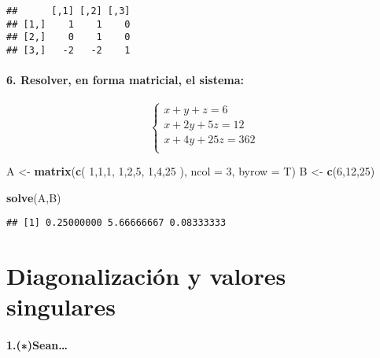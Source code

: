 \documentclass[]{article}
\newenvironment{Shaded}{\begin{snugshade}}{\end{snugshade}}
\newcommand{\DataTypeTok}[1]{\textcolor[rgb]{0.13,0.29,0.53}{#1}}
\newcommand{\DecValTok}[1]{\textcolor[rgb]{0.00,0.00,0.81}{#1}}
\newcommand{\KeywordTok}[1]{\textcolor[rgb]{0.13,0.29,0.53}{\textbf{#1}}}
\newcommand{\NormalTok}[1]{#1}
\newcommand{\StringTok}[1]{\textcolor[rgb]{0.31,0.60,0.02}{#1}}
\let\oldparagraph\paragraph
\renewcommand{\paragraph}[1]{\oldparagraph{#1}\mbox{}}
\begin{document}
\begin{verbatim}
##      [,1] [,2] [,3]
## [1,]    1    1    0
## [2,]    0    1    0
## [3,]   -2   -2    1
\end{verbatim}

\hypertarget{resolver-en-forma-matricial-el-sistema}{%
\paragraph{6. Resolver, en forma matricial, el
sistema:}\label{resolver-en-forma-matricial-el-sistema}}

\[ 
\begin{cases}
    x + y +z = 6 \\ 
   x + 2y+ 5z= 12 \\
   x+ 4y+ 25z= 362 \\
  \end{cases}
\]

\begin{Shaded}
\begin{Highlighting}[]
\NormalTok{A <-}\StringTok{ }\KeywordTok{matrix}\NormalTok{(}\KeywordTok{c}\NormalTok{(}
        \DecValTok{1}\NormalTok{,}\DecValTok{1}\NormalTok{,}\DecValTok{1}\NormalTok{,}
        \DecValTok{1}\NormalTok{,}\DecValTok{2}\NormalTok{,}\DecValTok{5}\NormalTok{,}
        \DecValTok{1}\NormalTok{,}\DecValTok{4}\NormalTok{,}\DecValTok{25}
\NormalTok{         ), }\DataTypeTok{ncol =} \DecValTok{3}\NormalTok{, }\DataTypeTok{byrow =}\NormalTok{ T)}
\NormalTok{B <-}\StringTok{ }\KeywordTok{c}\NormalTok{(}\DecValTok{6}\NormalTok{,}\DecValTok{12}\NormalTok{,}\DecValTok{25}\NormalTok{)}

\KeywordTok{solve}\NormalTok{(A,B)}
\end{Highlighting}
\end{Shaded}

\begin{verbatim}
## [1] 0.25000000 5.66666667 0.08333333
\end{verbatim}

\hypertarget{diagonalizacion-y-valores-singulares}{%
\section{Diagonalización y valores
singulares}\label{diagonalizacion-y-valores-singulares}}

\hypertarget{sean}{%
\paragraph{1.(∗)Sean\ldots{}}\label{sean}}
\end{document}
